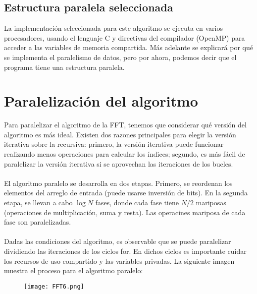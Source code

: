 \documentclass{article}
\begin{document}
\subsection{Estructura paralela seleccionada}
La implementación seleccionada para este algoritmo se ejecuta en varios procesadores, usando el lenguaje C y directivas del compilador (OpenMP) para acceder a las variables de memoria compartida. Más adelante se explicará por qué se implementa el paralelismo de datos, pero por ahora, podemos decir que el programa tiene una estructura paralela. 

\newpage
\section{Paralelización del algoritmo}
Para paralelizar el algoritmo de la FFT, tenemos que considerar qué versión del algoritmo es más ideal. Existen dos razones principales para elegir la versión iterativa sobre la recursiva: primero, la versión iterativa puede funcionar realizando menos operaciones para calcular los índices; segundo, es más fácil de paralelizar la versión iterativa si se aprovechan las iteraciones de los bucles.\\ \\
El algoritmo paralelo se desarrolla en dos etapas. Primero, se reordenan los elementos del arreglo de entrada (puede usarse inversión de bits). En la segunda etapa, se llevan a cabo $\log N$ fases, donde cada fase tiene $N/2$ mariposas (operaciones de multiplicación, suma y resta). Las operacines mariposa de cada fase son paralelizadas.\\ \\
Dadas las condiciones del algoritmo, es observable que se puede paralelizar dividiendo las iteraciones de los ciclos for. En dichos ciclos es importante cuidar los recursos de uso compartido y las variables privadas. La siguiente imagen muestra el proceso para el algoritmo paralelo:
\begin{figure}[h]
\texttt{[image: FFT6.png]}
\end{figure}
\end{document}

